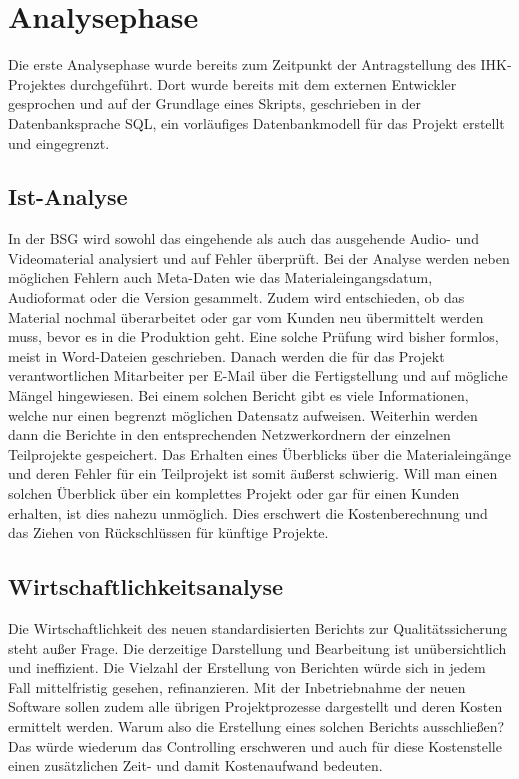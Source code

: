 \section{Analysephase} 
\label{sec:Analysephase}
Die erste Analysephase wurde bereits zum Zeitpunkt der Antragstellung des \ac{IHK}-Projektes durchgeführt. Dort wurde bereits mit dem externen Entwickler gesprochen und auf der Grundlage eines Skripts, geschrieben in der Datenbanksprache \acs{SQL}, ein vorläufiges Datenbankmodell für das Projekt erstellt und eingegrenzt.

\subsection{Ist-Analyse} 
\label{sec:IstAnalyse}
In der \ac{BSG} wird sowohl das eingehende als auch das ausgehende Audio- und Videomaterial analysiert und auf Fehler überprüft. Bei der Analyse werden neben möglichen Fehlern auch Meta-Daten wie das Materialeingangsdatum, Audioformat oder die Version gesammelt. Zudem wird entschieden, ob das Material nochmal überarbeitet oder gar vom Kunden neu übermittelt werden muss, bevor es in die Produktion geht. Eine solche Prüfung wird bisher formlos, meist in Word-Dateien geschrieben. Danach werden die für das Projekt verantwortlichen Mitarbeiter per E-Mail über die Fertigstellung und auf mögliche Mängel hingewiesen. Bei einem solchen Bericht gibt es viele Informationen, welche nur einen begrenzt möglichen Datensatz aufweisen. Weiterhin werden dann die Berichte in den entsprechenden Netzwerkordnern der einzelnen Teilprojekte gespeichert. Das Erhalten eines Überblicks über die Materialeingänge und deren Fehler für ein Teilprojekt ist somit äußerst schwierig. Will man einen solchen Überblick über ein komplettes Projekt oder gar für einen Kunden erhalten, ist dies nahezu unmöglich. Dies erschwert die Kostenberechnung und das Ziehen von Rückschlüssen für künftige Projekte.

\subsection{Wirtschaftlichkeitsanalyse}
\label{sec:Wirtschaftlichkeitsanalyse}
Die Wirtschaftlichkeit des neuen standardisierten Berichts zur Qualitätssicherung steht außer Frage. Die derzeitige Darstellung und Bearbeitung ist unübersichtlich und ineffizient. Die Vielzahl der Erstellung von Berichten würde sich in jedem Fall mittelfristig gesehen, refinanzieren. Mit der Inbetriebnahme der neuen Software sollen zudem alle übrigen Projektprozesse dargestellt und deren Kosten ermittelt werden. Warum also die Erstellung eines solchen Berichts ausschließen? Das würde wiederum das Controlling erschweren und auch für diese Kostenstelle einen zusätzlichen Zeit- und damit Kostenaufwand bedeuten.


